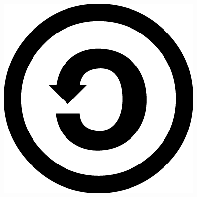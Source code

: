 \documentclass[twoside]{book}
\newcommand{\+}{\discretionary{\mbox{\scriptsize$\hookleftarrow$}}{}{}}
\newcommand{\clearemptydoublepage}{%
  \newpage{\pagestyle{empty}\cleardoublepage}%
}
\begin{document}
\begin{center}
\includegraphics[totalheight=5.mm]{figures/sa_large.png}%
\vspace*{0.25cm}

\end{center}

\clearemptydoublepage
\tableofcontents
\clearemptydoublepage
{}
\hypersetup{pageanchor=true}
\end{document}
